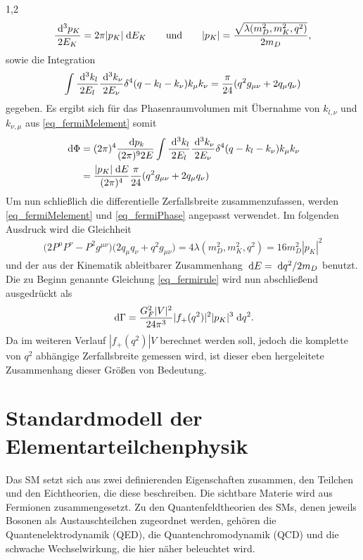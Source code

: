 \documentclass[11pt,a4paper,twoside,draft]{report}
\begin{document}
\begin{spacing}{1,2}
\begin{align}
 \frac{\; \mathrm{d}^3 p_K}{2E_K} = 2\pi |p_K| \; \mathrm{d} E_K \qquad \text{und} \qquad |p_K| = \frac{\sqrt{\lambda(m_D^2,m_K^2,q^2)}}{2m_D},
\end{align}
sowie die Integration
\begin{align}
 \int \frac{\; \mathrm{d}^3k_l}{2E_l}\frac{\; \mathrm{d}^3k_\nu}{2E_\nu}\delta^4(q-k_l-k_\nu)k_\mu k_\nu = \frac{\pi}{24}(q^2 g_{\mu\nu} + 2 q_\mu q_\nu)
\end{align}
gegeben. Es ergibt sich für das Phasenraumvolumen mit Übernahme von $k_{l,\nu}$ und $k_{\nu,\mu}$ aus \eqref{eq_fermiMelement} somit
\begin{align}
 \; \mathrm{d} \Phi &= (2\pi)^4 \frac{\; \mathrm{d} p_k}{(2\pi)^9 2E} \int \frac{\; \mathrm{d}^3k_l}{2E_l}\frac{\; \mathrm{d}^3k_\nu}{2E_\nu}\delta^4(q-k_l-k_\nu)k_\mu k_\nu \nonumber\\
 &= \frac{|p_K| \; \mathrm{d} E}{(2\pi)^4}\frac{\pi}{24}(q^2g_{\mu\nu} + 2 q_\mu q_\nu)
 \label{eq_fermiPhase}
\end{align}
Um nun schließlich die differentielle Zerfallsbreite zusammenzufassen, werden \eqref{eq_fermiMelement} und \eqref{eq_fermiPhase} angepasst verwendet. Im
folgenden Ausdruck wird die Gleichheit
\begin{align}
 \big(2P^\mu P^\nu - P^2 g^{\mu\nu}\big)\big(2q_\mu q_\nu + q^2g_{\mu\nu}) = 4 \lambda(m_D^2,m_K^2,q^2) = 16 m_D^2 |p_K|^2
\end{align}
und der aus der Kinematik ableitbarer Zusammenhang $\; \mathrm{d} E = \; \mathrm{d} q^2 / 2m_D$ benutzt. Die zu Beginn genannte Gleichung \eqref{eq_fermirule} wird 
nun abschließend ausgedrückt als
\begin{align}
 \; \mathrm{d} \Gamma = \frac{G_F^2|V|^2}{24\pi^3} |f_+(q^2)|^2 |p_K|^3 \; \mathrm{d} q^2.
 \label{eq_fermidGammafinal}
\end{align}
Da im weiteren Verlauf $|f_+(q^2)|V$ berechnet werden soll, jedoch die komplette von $q^2$ abhängige Zerfallsbreite gemessen wird, ist dieser eben hergeleitete
Zusammenhang dieser Größen von Bedeutung.



\section{Standardmodell der Elementarteilchenphysik}
Das SM setzt sich aus zwei definierenden Eigenschaften zusammen, den Teilchen und den Eichtheorien, die diese beschreiben. Die sichtbare Materie wird 
aus Fermionen zusammengesetzt. Zu den Quantenfeldtheorien des SMs, denen jeweils Bosonen als Austauschteilchen zugeordnet werden, gehören die 
Quantenelektrodynamik (QED), die Quantenchromodynamik (QCD) und die schwache Wechselwirkung, die hier näher beleuchtet wird. 


\end{spacing}
\end{document}

